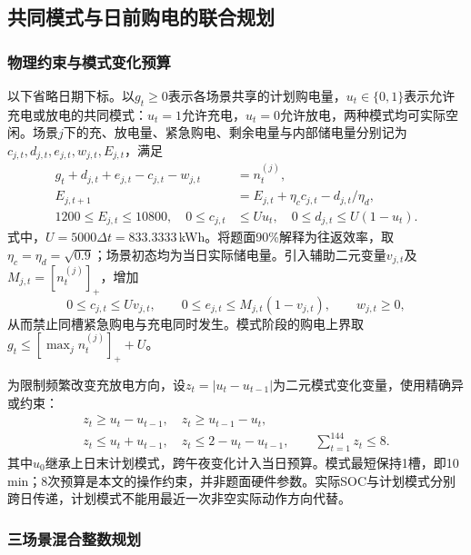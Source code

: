 \subsection{共同模式与日前购电的联合规划}
\subsubsection{物理约束与模式变化预算}

以下省略日期下标。以$g_t\ge0$表示各场景共享的计划购电量，$u_t\in\{0,1\}$表示允许充电或放电的共同模式：$u_t=1$允许充电，$u_t=0$允许放电，两种模式均可实际空闲。场景$j$下的充、放电量、紧急购电、剩余电量与内部储电量分别记为$c_{j,t},d_{j,t},e_{j,t},w_{j,t},E_{j,t}$，满足
\begin{equation}\label{eq:q2-scenario-physics}
 \begin{aligned}
 g_t+d_{j,t}+e_{j,t}-c_{j,t}-w_{j,t}&=n^{(j)}_t,\\
 E_{j,t+1}&=E_{j,t}+\eta_c c_{j,t}-d_{j,t}/\eta_d,\\
 1200\le E_{j,t}\le10800,\quad
 0\le c_{j,t}&\le Uu_t,\quad0\le d_{j,t}\le U(1-u_t).
 \end{aligned}
\end{equation}
式中，$U=5000\Delta t=833.3333$\,kWh。将题面90\%解释为往返效率，取$\eta_c=\eta_d=\sqrt{0.9}$；场景初态均为当日实际储电量。引入辅助二元变量$v_{j,t}$及$M_{j,t}=[n^{(j)}_t]_+$，增加
\begin{equation}\label{eq:q2-no-emergency-charge}
 0\le c_{j,t}\le Uv_{j,t},\qquad
 0\le e_{j,t}\le M_{j,t}(1-v_{j,t}),\qquad w_{j,t}\ge0,
\end{equation}
从而禁止同槽紧急购电与充电同时发生。模式阶段的购电上界取$g_t\le[\max_j n^{(j)}_t]_++U$。

为限制频繁改变充放电方向，设$z_t=|u_t-u_{t-1}|$为二元模式变化变量，使用精确异或约束：
\begin{equation}\label{eq:q2-mode-budget}
 \begin{gathered}
 z_t\ge u_t-u_{t-1},\quad z_t\ge u_{t-1}-u_t,\\
 z_t\le u_t+u_{t-1},\quad z_t\le2-u_t-u_{t-1},\qquad
 \sum_{t=1}^{144}z_t\le8.
 \end{gathered}
\end{equation}
其中$u_0$继承上日末计划模式，跨午夜变化计入当日预算。模式最短保持1槽，即10\,min；8次预算是本文的操作约束，并非题面硬件参数。实际SOC与计划模式分别跨日传递，计划模式不能用最近一次非空实际动作方向代替。

\subsubsection{三场景混合整数规划}

